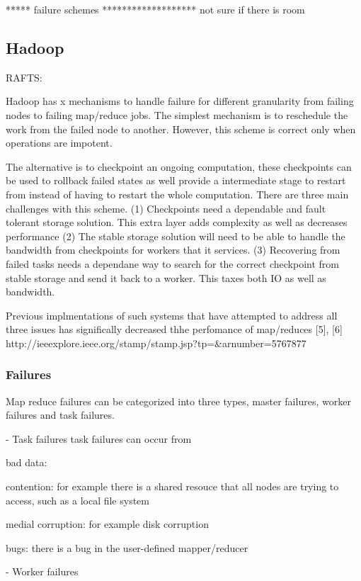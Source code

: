 \documentclass[10pt,twocolumn]{IEEEtran11}
\begin{document}
***** failure schemes *******************
not sure if there is room




\subsection{Hadoop}
RAFTS:

    Hadoop has x mechanisms to handle failure for different granularity from failing nodes to failing map/reduce jobs.
The simplest mechanism is to reschedule the work from the failed node to another.  However, this scheme is correct only when operations are impotent.  
\par
The alternative is to checkpoint an ongoing computation, these checkpoints can be used to rollback failed states as well provide a intermediate stage to restart from instead of having to restart the whole computation.  There are three main challenges with this scheme.
(1) Checkpoints need a dependable and fault tolerant storage solution.  This extra layer adds complexity as well as decreases performance
(2) The stable storage solution will need to be able to handle the bandwidth from checkpoints for workers that it services.
(3) Recovering from failed tasks needs a dependane way to search for the correct checkpoint from stable storage and
send it back to a worker.  This taxes both IO as well as bandwidth.
\par
Previous implmentations of such systems that have attempted to address all three issues has significally decreased thhe perfomance of map/reduces [5], [6] http://ieeexplore.ieee.org/stamp/stamp.jsp?tp=&arnumber=5767877

\subsubsection{Failures}
Map reduce failures can be categorized into three types, master failures, worker failures and task failures.

- Task failures
task failures can occur from

bad data:

contention:
    for example there is a shared resouce that all nodes are trying to access, such as a local file system

medial corruption:
    for example disk corruption
    
bugs:
    there is a bug in the user-defined mapper/reducer
    

- Worker failures
\end{document}
